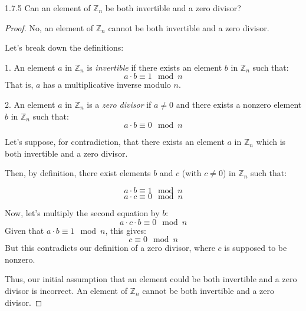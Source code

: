 \documentclass[12pt]{amsart}
\theoremstyle{definition}
\numberwithin{equation}{section}
\theoremstyle{plain}
\newcommand{\Z}{\mathbb{Z}}
\begin{document}
\begin{exercise}{1.7.5}
    Can an element of $\Z_n$ be both invertible and a zero divisor?
\begin{proof} 
    No, an element of \( \Z_n \) cannot be both invertible and a zero divisor.

    Let's break down the definitions:
    
    1. An element \( a \) in \( \Z_n \) is \textit{invertible} if there exists an element \( b \) in \( \Z_n \) such that:
    \[ a \cdot b \equiv 1 \mod n \]
    That is, \( a \) has a multiplicative inverse modulo \( n \).
    
    2. An element \( a \) in \( \Z_n \) is a \textit{zero divisor} if \( a \neq 0 \) and there exists a nonzero element \( b \) in \( \Z_n \) such that:
    \[ a \cdot b \equiv 0 \mod n \]
    
    Let's suppose, for contradiction, that there exists an element \( a \) in \( \Z_n \) which is both invertible and a zero divisor.
    
    Then, by definition, there exist elements \( b \) and \( c \) (with \( c \neq 0 \)) in \( \Z_n \) such that:
    
    \[ a \cdot b \equiv 1 \mod n \]
    \[ a \cdot c \equiv 0 \mod n \]
    
    Now, let's multiply the second equation by \( b \):
    \[ a \cdot c \cdot b \equiv 0 \mod n \]
    Given that \( a \cdot b \equiv 1 \mod n \), this gives:
    \[ c \equiv 0 \mod n \]
    But this contradicts our definition of a zero divisor, where \( c \) is supposed to be nonzero.
    
    Thus, our initial assumption that an element could be both invertible and a zero divisor is incorrect. An element of \( \Z_n \) cannot be both invertible and a zero divisor.
\end{proof}
\end{exercise}
\end{document}
